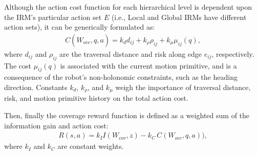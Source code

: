 \documentclass[letterpaper]{article} %
\begin{document}
Although the action cost function for each hierarchical level is dependent upon the IRM's particular action set $E$ (i.e., Local and Global IRMs have different action sets), it can be generically formulated as:
\begin{align}
    C(\hat{W}_{occ}, q, a) = k_d d_{ij} + k_\rho \rho_{ij} + k_\mu \mu_{ij}(q),
\end{align}
where $d_{ij}$ and $\rho_{ij}$ are the traversal distance and risk along edge $e_{ij}$, respectively. The cost $\mu_{ij}(q)$ is associated with the current motion primitive, and is a consequence of the robot's non-holonomic constraints, such as the heading direction. Constants $k_d$, $k_\rho$, and $k_\mu$ weigh the importance of traversal distance, risk, and motion primitive history on the total action cost.

Then, finally the coverage reward function is defined as a weighted sum of the information gain and action cost:
\begin{align}
    R(s, a) = k_I I(W_{cov}, z) - k_C \, C(W_{occ}, q, a)),
\end{align}
where $k_I$ and $k_C$ are constant weights.



\end{document}
